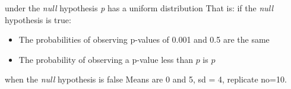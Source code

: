 \documentclass[pdf]{beamer}
\begin{document}
\begin{frame}{under the \emph{null} hypothesis \emph{p} has a uniform
    distribution}
  That is: if the \emph{null} hypothesis is true:
  \begin{itemize}
  \item The probabilities of observing p-values of 0.001 and 0.5 are the
    same
    \pause
  \item The probability of observing a p-value less than $p$ is $p$
  \end{itemize}
\end{frame}

\begin{frame}[fragile]{when the \emph{null} hypothesis is false}
  Means are 0 and 5, sd = 4, replicate no=10.
  \begin{figure}[ht]
  \end{figure}
\end{frame}
\end{document}
